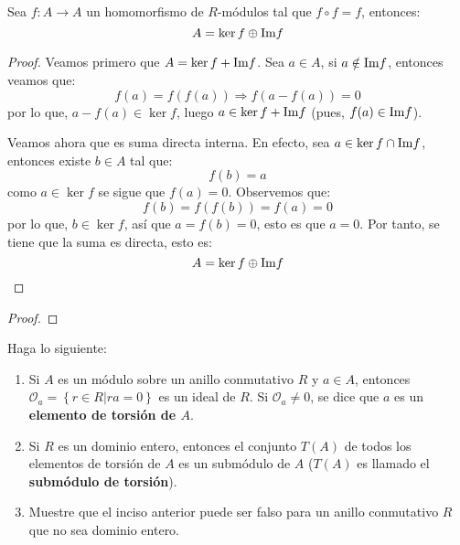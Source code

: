 \documentclass[12pt]{report}
\newcounter{it}
\theoremstyle{largebreak}
\newcommand\cf[3]{\ensuremath{#1:#2\rightarrow#3}}
\newcommand{\im}{\ensuremath{\textup{Im}}}
\begin{document}
    \begin{excer}
        Sea $\cf{f}{A}{A}$ un homomorfismo de $R$-módulos tal que $f\circ f=f$, entonces:
        \begin{equation*}
            A=\ker f\oplus\im f
        \end{equation*}
    \end{excer}

    \begin{proof}
        Veamos primero que $A=\ker f+\im f$. Sea $a\in A$, si $a\notin\im f$, entonces veamos que:
        \begin{equation*}
            f(a)=f(f(a))\Rightarrow f(a-f(a))=0
        \end{equation*}
        por lo que, $a-f(a)\in\ker f$, luego $a\in\ker f+\im f$ (pues, $f(a)\in\im f$).

        Veamos ahora que es suma directa interna. En efecto, sea $a\in\ker f\cap\im f$, entonces existe $b\in A$ tal que:
        \begin{equation*}
            f(b)=a
        \end{equation*}
        como $a\in\ker f$ se sigue que $f(a)=0$. Observemos que:
        \begin{equation*}
            f(b)=f(f(b))=f(a)=0
        \end{equation*}
        por lo que, $b\in\ker f$, así que $a=f(b)=0$, esto es que $a=0$. Por tanto, se tiene que la suma es directa, esto es:
        \begin{equation*}
            A=\ker f\oplus\im f
        \end{equation*}
    \end{proof}

    \begin{excer}[Nombre]
        
    \end{excer}

    \begin{proof}
        
    \end{proof}

    \begin{excer}
        Haga lo siguiente:
        \begin{enumerate}[label = \textit{(\alph*)}]
            \item Si $A$ es un módulo sobre un anillo conmutativo $R$ y $a\in A$, entonces $\mathcal{O}_a=\left\{r\in R\Big|ra=0 \right\}$ es un ideal de $R$. Si $\mathcal{O}_a\neq0$, se dice que $a$ es un \textbf{elemento de torsión de $A$}.
            \item Si $R$ es un dominio entero, entonces el conjunto $T(A)$ de todos los elementos de torsión de $A$ es un submódulo de $A$ ($T(A)$ es llamado el \textbf{submódulo de torsión}).
            \item Muestre que el inciso anterior puede ser falso para un anillo conmutativo $R$ que no sea dominio entero.
        \end{enumerate}
    \end{excer}
\end{document}

